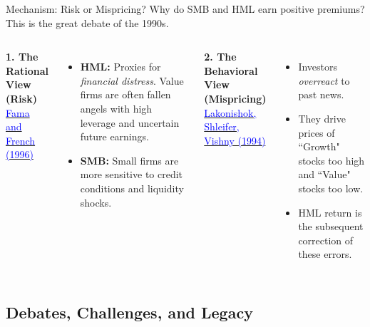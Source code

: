 \documentclass{beamer}
\begin{document}
\begin{frame}{Mechanism: Risk or Mispricing?}
	Why do SMB and HML earn positive premiums? This is the great debate of the 1990s.
	\vspace{5pt}
	\begin{columns}
		\textbf{1. The Rational View (Risk)} \\
		\href{https://doi.org/10.1111/j.1540-6261.1996.tb05202.x}{\textcolor{blue}{Fama and French (1996)}}
		\begin{itemize}
			\item \textbf{HML:} Proxies for \textit{financial distress}. Value firms are often fallen angels with high leverage and uncertain future earnings.
			\item \textbf{SMB:} Small firms are more sensitive to credit conditions and liquidity shocks.
		\end{itemize}
		
		\textbf{2. The Behavioral View (Mispricing)} \\
		\href{10.1111/j.1540-6261.1994.tb04772.x}{\textcolor{blue}{Lakonishok, Shleifer, Vishny (1994)}}
		\begin{itemize}
			\item Investors \textit{overreact} to past news.
			\item They drive prices of ``Growth" stocks too high and ``Value" stocks too low.
			\item HML return is the subsequent correction of these errors.
		\end{itemize}
	\end{columns}
\end{frame}

\subsection{Debates, Challenges, and Legacy}
\end{document}
